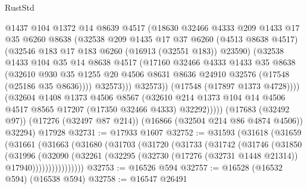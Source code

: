 \begin{lexlean}{RustStd}
\begin{coremodule}
                    @1437
                    @104
                    @1372
                    @14
                    @8639
                    @4517
                    (@18630
                      @32466
                      @4333
                      @209
                      @1433
                      @17
                      @35
                      @6260
                      @8638
                      (@32538
                        @209
                        @1435
                        @17
                        @37
                        @6260
                        (@4513 @8638 @4517)
                        (@32546 @183 @17 @183 @6260 (@16913 (@32551 @183)) @23590)
                        (@32538
                          @1433
                          @104
                          @35
                          @14
                          @8638
                          @4517
                          (@17160
                            @32466
                            @4333
                            @1433
                            @35
                            @8638
                            (@32610
                              @930
                              @35
                              @1255
                              @20
                              @4506
                              @8631
                              @8636
                              @24910
                              @32576
                              (@17548 (@25186 @35 @8636))))
                          @32573)))
                    @32573))
                (@17548 (@17897 @1373 @4728))))
            (@32604
              @1408
              @1373
              @4506
              @8567
              (@32610 @214 @1373 @104 @14 @4506 @4517 @8565 @17207 (@17350 @32466 @4333) @32292)))))
      (@17683 (@32492 @97))
      (@17276 (@32497 @87 @214))
      (@16866 (@32504 @214 @86 @4874 @4506))
      @32294)
    @17928
@32731 := @17933 @1607
@32752 := @31593
    (@31618
      (@31659
        (@31661
          (@31663
            (@31680
              (@31703
                (@31720
                  (@31733
                    (@31742
                      (@31746
                        (@31850
                          (@31996
                            (@32090
                              (@32261
                                (@32295
                                  (@32730 (@17276 (@32731 @1448 @21314)) @17940))))))))))))))))
@32753 := @16526 @594
@32757 := @16528 (@16532 @594) (@16538 @594)
@32758 := @16547 @26491

\end{coremodule}
\end{lexlean}
